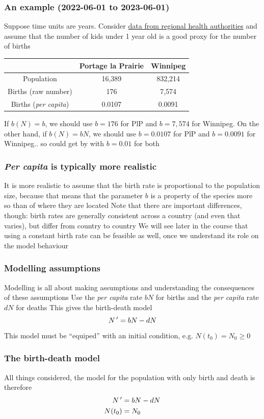 \documentclass[aspectratio=169]{beamer}
\begin{document}
\begin{frame}\frametitle{An example (2022-06-01 to 2023-06-01)}
Suppose time units are years. Consider \href{https://www.gov.mb.ca/health/population/pr2023.pdf}{data from regional health authorities} and assume that the number of kids under 1 year old is a good proxy for the number of births
\vfill
\begin{center}
\begin{tabular}{ccc}
\toprule
& Portage la Prairie & Winnipeg\\
\midrule
Population & 16,389 & 832,214 \\
Births (raw number) & 176 & 7,574 \\
Births (\emph{per capita}) & 0.0107 & 0.0091 \\
\end{tabular}
\end{center}
\vfill
If $b(N)=b$, we should use $b=176$ for PlP and $b=7,574$ for Winnipeg. On the other hand, if $b(N)=bN$, we should use $b=0.0107$ for PlP and $b=0.0091$ for Winnipeg.. so could get by with $b=0.01$ for both
\end{frame}

\begin{frame}\frametitle{\emph{Per capita} is typically more realistic}
It is more realistic to assume that the birth rate is proportional to the population size, because that means that the parameter $b$ is a property of the species more so than of where they are located
\vfill
Note that there are important differences, though: birth rates are generally consistent across a country (and even that varies), but differ from country to country
\vfill
We will see later in the course that using a constant birth rate can be feasible as well, once we understand its role on the model behaviour
\end{frame}

\begin{frame}\frametitle{Modelling assumptions}
Modelling is all about making assumptions and understanding the consequences of these assumptions
\vfill
Use the \emph{per capita} rate $bN$ for births and the \emph{per capita} rate $dN$ for deaths
\vfill
This gives the birth-death model
\[
N\,'=bN-dN
\]
This model must be ``equiped'' with an initial condition, e.g. $N(t_0)=N_0\geq 0$
\end{frame}

\begin{frame}\frametitle{The birth-death model}
All things considered, the model for the population with only birth and death is therefore
\begin{subequations}
\label{sys:birth-death-ODE}
\begin{align}
N\,' &= bN-dN \label{sys:birth-death-ODE-dN} \\
N(t_0) &= N_0 \label{sys:birth-death-ODE-IC}
\end{align}
\end{subequations}
\end{frame}
\end{document}
